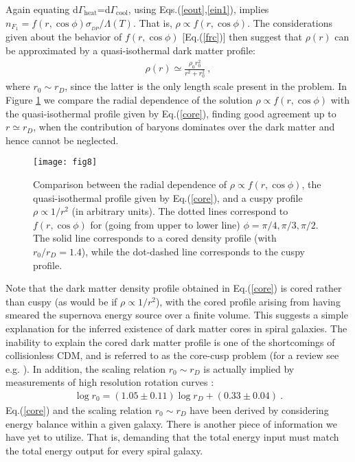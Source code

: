 \documentclass[12pt]{article}
\begin{document}
{{Again equating d$\Gamma _{\text{heat}}$=d$\Gamma _{\text{cool}}$, using Eqs.(\ref{eout},\ref{ein1}), implies $n _{F_1} = f(r,\cos \phi)\sigma _{_{DP}}/\Lambda (T)$. That is, $\rho \propto f(r,\cos \phi )$. The considerations given about the behavior of $f(r,\cos \phi)$ [Eq.(\ref{frc})] then suggest that $\rho (r)$ can be approximated by a quasi-isothermal dark matter profile:
%
\begin{eqnarray}
\rho (r) \simeq \frac{\rho _0r _0 ^2}{r ^2 + r _0 ^2} \ ,
\label{core}
\end{eqnarray}
%
where $r _0 \sim r_D$, since the latter is the only length scale present in the problem. In Figure \ref{fig:Comparison core f} we compare the radial dependence of the solution $\rho \propto f(r,\cos \phi)$ with the quasi-isothermal profile given by Eq.(\ref{core}), finding good agreement up to $r \simeq r _D$, when the contribution of baryons dominates over the dark matter and hence cannot be neglected.

\begin{figure}[htpb]
    \vskip 1cm
    \centering
        \texttt{[image: fig8]}
    \caption{Comparison between the radial dependence of $\rho \propto f(r,\cos \phi)$, the quasi-isothermal profile given by Eq.(\ref{core}), and a cuspy profile $\rho \propto 1/r ^2$ (in arbitrary units). The dotted lines correspond to $f(r,\cos \phi)$ for (going from upper to lower line) $\phi=\pi/4,\pi/3,\pi/2$. The solid line corresponds to a cored density profile (with $r _0/r _D = 1.4$), while the dot-dashed line corresponds to the cuspy profile.}
    \label{fig:Comparison core f}
    \vskip 0.8cm
\end{figure}

Note that the dark matter density profile obtained in Eq.(\ref{core}) is cored rather than cuspy (as would be if $\rho \propto 1/r ^2$), with the cored profile arising from having smeared the supernova energy source over a finite volume. This suggests a simple explanation for the inferred existence of dark matter cores in spiral galaxies. The inability to explain the cored dark matter profile is one of the shortcomings of collisionless CDM, and is referred to as the core-cusp problem (for a review see e.g. \cite{deblok}). In addition, the scaling relation $r _0 \sim r_D$ is actually implied by measurements of high resolution rotation curves \cite{donato}:
%
\begin{eqnarray}
\log r _0 = (1.05 \pm 0.11) \log r_D + (0.33 \pm 0.04) \ .
\end{eqnarray}
%
Eq.(\ref{core}) and the scaling relation $r _0 \sim r _D$ have been derived by considering energy balance within a given galaxy. There is another piece of information we have yet to utilize. That is, demanding that the total energy input must match the total energy output for every spiral galaxy.

}}
\end{document}
